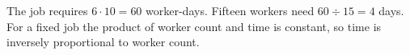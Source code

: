 The job requires $ 6\cdot10=60 $ worker-days. Fifteen workers need $ 60\div15=\boxed4 $ days. For a fixed job the product of worker count and time is constant, so time is inversely proportional to worker count.
